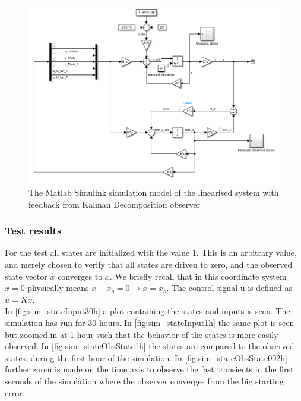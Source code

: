 \begin{figure}[h!]
	\centering
	\includegraphics[width=1\textwidth]{Graphics/fig_modelSS_obs.png}
	\caption{The Matlab Simulink simulation model of the linearised system with feedback from Kalman Decomposition observer}
	\label{fig:sim_modelSS_obs}
\end{figure}

\subsubsection{Test results}

For the test all states are initialized with the value 1. This is an arbitrary value, and merely chosen to verify that all states are driven to zero, and the observed state vector $\hat{x}$ converges to $x$. We briefly recall that in this coordinate system $x=0$ physically means $x-x_o = 0 \rightarrow x=x_o$. The control signal u is defined as $u=K\hat{x}$.\\

In \cref{fig:sim_stateInput30h} a plot containing the states and inputs is seen. The simulation has run for 30 hours. In \cref{fig:sim_stateInput1h} the same plot is seen but zoomed in at 1 hour such that the behavior of the states is more easily observed. In \cref{fig:sim_stateObsState1h} the states are compared to the observed states, during the first hour of the simulation. In \cref{fig:sim_stateObsState002h} further zoom is made on the time axis to observe the fast transients in the first seconds of the simulation where the observer converges from the big starting error.


